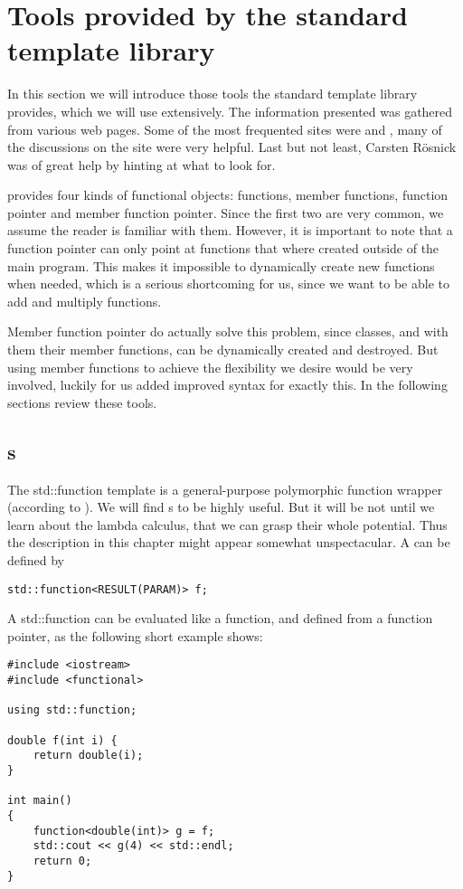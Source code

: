 \section{Tools provided by the \ccOx standard template library}

In this section we will introduce those tools the \ccOx standard template library provides, which we will use extensively. The information presented was gathered from various web pages. Some of the most frequented sites were \cite{cppreference} and \cite{cplusplus}, many of the discussions on the site \cite{stackoverflow} were very helpful. Last but not least, Carsten Rösnick was of great help by hinting at what to look for.

\cc provides four kinds of functional objects: functions, member functions, function pointer and member function pointer. Since the first two are very common, we assume the reader is familiar with them. However, it is important to note that a function pointer can only point at functions that where created outside of the main program. This makes it impossible to dynamically create new functions when needed, which is a serious shortcoming for us, since we want to be able to add and multiply functions.

Member function pointer do actually solve this problem, since classes, and with them their member functions, can be dynamically created and destroyed. But using member functions to achieve the flexibility we desire would be very involved, luckily for us \ccOx added improved syntax for exactly this. In the following sections review these tools.

\subsection{s}\label{sec: std::functions}

The std::function template is a general-purpose polymorphic function wrapper (according to \cite{cppreference}). We will find s to be highly useful. But it will be not until we learn about the \cc lambda calculus, that we can grasp their whole potential. Thus the description in this chapter might appear somewhat unspectacular. A  can be defined by
\begin{lstlisting}
std::function<RESULT(PARAM)> f;
\end{lstlisting}

A std::function can be evaluated like a function, and defined from a function pointer, as the following short example shows:
\begin{lstlisting}
#include <iostream>
#include <functional>

using std::function;

double f(int i) {
	return double(i);
}

int main()
{
	function<double(int)> g = f;
	std::cout << g(4) << std::endl;
	return 0;
}
\end{lstlisting}

